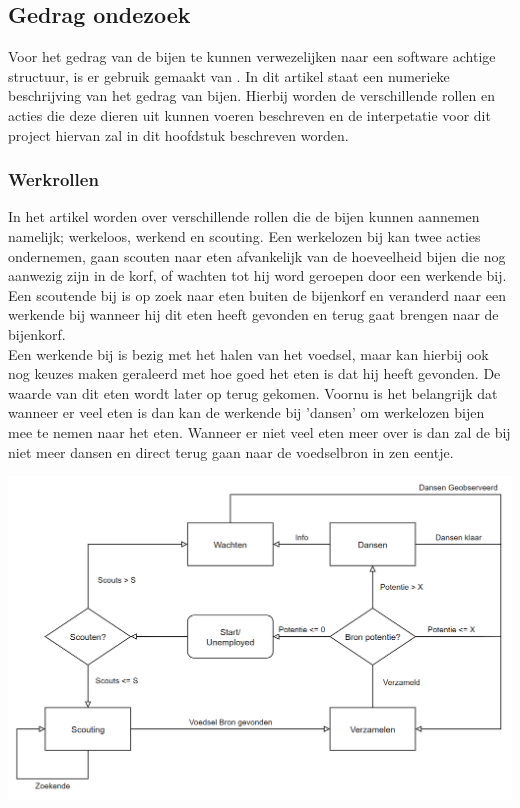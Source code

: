 \subsection{Gedrag ondezoek}
Voor het gedrag van de bijen te kunnen verwezelijken naar een software achtige structuur, is er gebruik gemaakt van
\cite{akbari_mohammadi_ziarati_2010}. In dit artikel staat een numerieke beschrijving van het gedrag van bijen.
Hierbij worden de verschillende rollen en acties die deze dieren uit kunnen voeren beschreven
en de interpetatie voor dit project hiervan zal in dit hoofdstuk beschreven worden.

\subsubsection{Werkrollen}
In het artikel worden over verschillende rollen die de bijen kunnen aannemen namelijk; werkeloos, werkend en scouting.
Een werkelozen bij kan twee acties ondernemen, gaan scouten naar eten afvankelijk van de hoeveelheid bijen die nog aanwezig zijn in de korf,
of wachten tot hij word geroepen door een werkende bij. Een scoutende bij is op zoek naar eten buiten de bijenkorf en veranderd naar een werkende bij
wanneer hij dit eten heeft gevonden en terug gaat brengen naar de bijenkorf.\\

Een werkende bij is bezig met het halen van het voedsel, maar kan hierbij ook nog keuzes maken geraleerd met hoe goed het eten is dat hij heeft gevonden.
De waarde van dit eten wordt later op terug gekomen. Voornu is het belangrijk dat wanneer er veel eten is dan kan de werkende bij 'dansen'
om werkelozen bijen mee te nemen naar het eten. Wanneer er niet veel eten meer over is dan zal de bij niet meer dansen en direct terug gaan naar de voedselbron 
in zen eentje.

\includegraphics[scale=0.33]{../IMAGES/BijengedragFlowchart.png}

